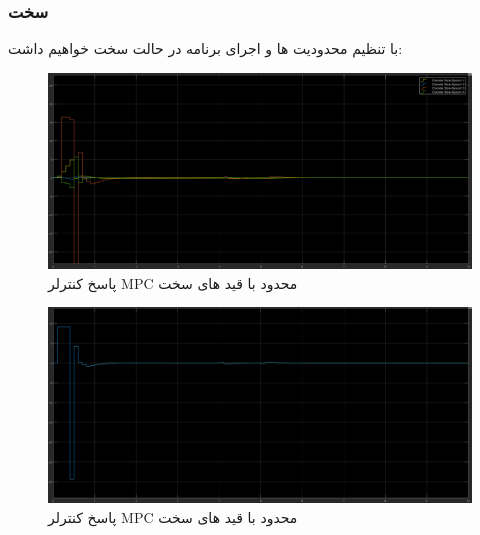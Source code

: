 \subsubsection{سخت}
با تنظیم محدودیت ها و اجرای برنامه در حالت سخت خواهیم داشت:

\begin{figure}[H]
	\centering
	\includegraphics[width=1\linewidth]{../img/Q5_Hard_output}
	\caption{پاسخ کنترلر MPC محدود با قید های سخت}
	\label{fig:q5hardoutput}
\end{figure}

\begin{figure}[H]
	\centering
	\includegraphics[width=1\linewidth]{../img/Q5_Hard_control_effort}
	\caption{پاسخ کنترلر MPC محدود با قید های سخت}
	\label{fig:q5hardcontroleffort}
\end{figure}



 
 
 
 
 
 
 
 
 
 
 